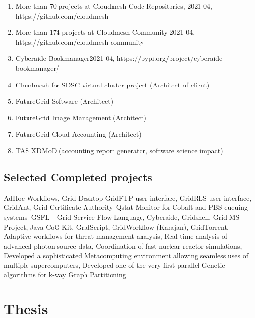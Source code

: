 \documentclass{article}
\begin{document}
\begin{enumerate}
\item  More than 70 projects at Cloudmesh Code Repositories, 2021-04, https://github.com/cloudmesh
\item  More than 174 projects at Cloudmesh Community 2021-04, https://github.com/cloudmesh-community
\item  Cyberaide Bookmanager2021-04, https://pypi.org/project/cyberaide-bookmanager/
\item  Cloudmesh for SDSC virtual cluster project (Architect of client)
\item  FutureGrid Software (Architect)
\item  FutureGrid Image Management (Architect)
\item  FutureGrid Cloud Accounting (Architect)
\item  TAS  XDMoD (accounting report generator,  software science impact)
\end{enumerate}

\subsection{Selected Completed projects} 

AdHoc Workflows, Grid Desktop   GridFTP user interface, GridRLS user interface, GridAnt, Grid Certificate Authority, Qstat Monitor for Cobalt and PBS queuing systems, GSFL – Grid Service Flow Language, Cyberaide, Gridshell, Grid MS Project, Java CoG Kit, GridScript, GridWorkflow (Karajan), GridTorrent, Adaptive workflows for threat management analysis, Real time analysis of advanced photon source data, Coordination of fast nuclear reactor simulations, Developed a sophisticated Metacomputing environment allowing seamless uses of multiple supercomputers, Developed one of the very first parallel Genetic algorithms for k-way Graph Partitioning 



\newcommand{\pbib}{\stepcounter{varseg} \printbibliography[heading=none,resetnumbers=false,segment=\the\numexpr\value{varseg}]}

\section{Thesis}


\begin{refsegment}

\nocite{las-96-thesis}

\end{refsegment}
\end{document}
